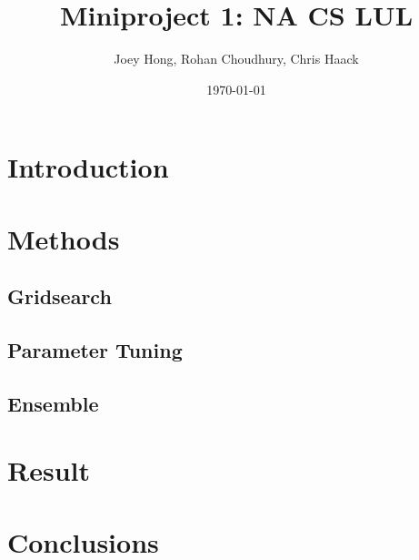\documentclass{article}
\title{Miniproject 1: NA CS LUL}
\author{Joey Hong, Rohan Choudhury, Chris Haack}
\date{\today}
\begin{document}
\maketitle
\section{Introduction}

\section{Methods}

\subsection{Gridsearch}

\subsection{Parameter Tuning}

\subsection{Ensemble}

\section{Result}


\section{Conclusions}
\end{document}

